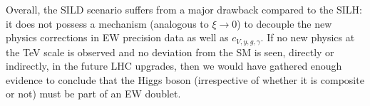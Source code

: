 
Overall, the SILD scenario suffers from a major drawback compared to the SILH: it does not possess a mechanism (analogous to $\xi\to0$) to decouple the new physics corrections in EW precision data as well as $c_{V,y,g,\gamma}$. If no new physics at the TeV scale is observed and no deviation from the SM is seen, directly or indirectly, in the future LHC upgrades, then we would have gathered enough evidence to conclude that the Higgs boson (irrespective of whether it is composite or not) must be part of an EW doublet. 




